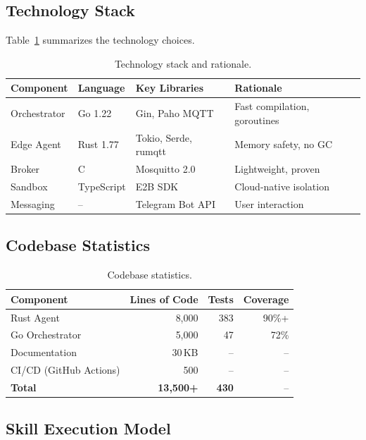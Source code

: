 \documentclass{article}
\begin{document}
\subsection{Technology Stack}

Table~\ref{tab:tech_stack} summarizes the technology choices.

\begin{table}[t]
\centering
\caption{Technology stack and rationale.}
\label{tab:tech_stack}
\small
\begin{tabular}{llll}
\toprule
\textbf{Component} & \textbf{Language} & \textbf{Key Libraries} & \textbf{Rationale} \\
\midrule
Orchestrator & Go 1.22 & Gin, Paho MQTT & Fast compilation, goroutines \\
Edge Agent & Rust 1.77 & Tokio, Serde, rumqtt & Memory safety, no GC \\
Broker & C & Mosquitto 2.0 & Lightweight, proven \\
Sandbox & TypeScript & E2B SDK & Cloud-native isolation \\
Messaging & -- & Telegram Bot API & User interaction \\
\bottomrule
\end{tabular}
\end{table}


\subsection{Codebase Statistics}

\begin{table}[t]
\centering
\caption{Codebase statistics.}
\label{tab:codebase}
\small
\begin{tabular}{lrrr}
\toprule
\textbf{Component} & \textbf{Lines of Code} & \textbf{Tests} & \textbf{Coverage} \\
\midrule
Rust Agent & 8,000 & 383 & 90\%+ \\
Go Orchestrator & 5,000 & 47 & 72\% \\
Documentation & 30\,KB & -- & -- \\
CI/CD (GitHub Actions) & 500 & -- & -- \\
\midrule
\textbf{Total} & \textbf{13,500+} & \textbf{430} & -- \\
\bottomrule
\end{tabular}
\end{table}


\subsection{Skill Execution Model}
\end{document}
